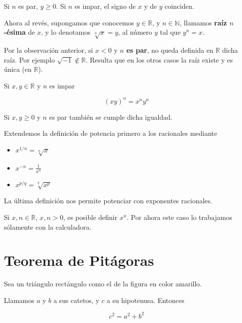 \begin{observation}
Si $n$ es par, $y \geq 0$.  Si $n$ es impar, el signo de $x$ y de $y$ coinciden.
\end{observation}	

\begin{definition}
Ahora al revés, supongamos que conocemos $y \in \mathbb{R}$, y $n \in \mathbb{N}$, llamamos \textbf{raíz $n$-ésima} de $x$, y lo denotamos $\sqrt[n]{x} = y$, al número $y$ tal que $y^n = x$.
\end{definition}	

\begin{observation}
Por la observación anterior, si $x < 0$ y \textbf{$n$ es par}, no queda definida en $\mathbb{R}$ dicha raíz.  Por ejemplo $\sqrt{-1} \not\in \mathbb{R}$.  Resulta que en los otros casos la raíz existe y es única (en $\mathbb{R}$).
\end{observation}

\begin{property}
Si $x,y \in \mathbb{R}$ y $n$ es impar

$$ (xy)^n = x^n y^n $$

Si $x,y \geq 0$ y $n$ es par también se cumple dicha igualdad.
\end{property}

\begin{definition}
Extendemos la definición de potencia primero a los racionales mediante

\begin{itemize}
\item $x^{1/n} = \sqrt[n]{x}$ 
\item $x^{-n} = \frac{1}{x^n}$
\item $x^{p/q} = \sqrt[q]{x^p}$
\end{itemize}
	
La última definición nos permite potenciar con exponentes racionales.  

Si $x,n \in \mathbb{R}$, $x,n>0$, es posible definir $x^n$.  Por ahora este caso lo trabajamos sólamente con la calculadora.
	
\end{definition}


\section{Teorema de Pitágoras}

\begin{theorem}[Pitágoras] 
Sea un triángulo rectángulo como el de la figura en color amarillo.

Llamamos $a$ y $b$ a sus catetos, y $c$ a su hipotenusa.  Entonces 

$$ c^2 = a^2 + b^2 $$
\end{theorem}

